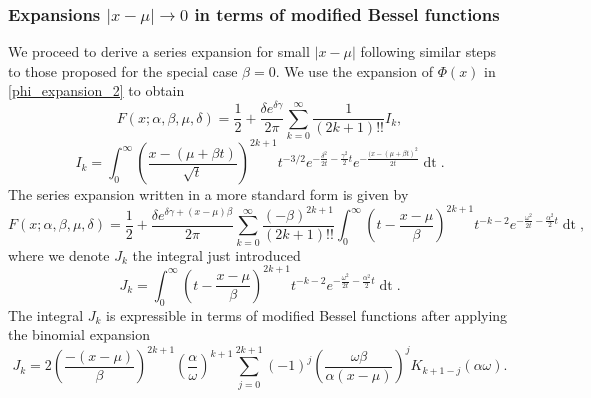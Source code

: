 \documentclass[10pt,a4paper,oneside]{article}
\numberwithin{equation}{section}
\begin{document}
\subsubsection{Expansions $|x-\mu| \to 0$ in terms of modified Bessel functions}
We proceed to derive a series expansion for small $|x-\mu|$ following similar steps to those proposed for the special case $\beta = 0$. We use the expansion of $\Phi(x)$ in  \eqref{phi_expansion_2} to obtain
\begin{equation}\label{general_series_xmu_zero_integral}
F(x;\alpha, \beta, \mu, \delta) = \frac{1}{2} + \frac{\delta e^{\delta \gamma}}{2\pi} \sum_{k=0}^{\infty} \frac{1}{(2k + 1)!!}I_k,
\end{equation}
\begin{equation}\label{general_xmu_zero_integral}
I_k = \int_0^{\infty} \left(\frac{x - (\mu +\beta t)}{\sqrt{t}}\right)^{2k+1} t^{-3/2} e^{-\frac{\delta^2}{2t} - \frac{\gamma^2}{2}t} e^{- \frac{(x-(\mu + \beta t)^2}{2t}} \mathop{dt}.
\end{equation}
The series expansion written in a more standard form is given by
\begin{equation}\label{general_series_xmu_zero_integral_2}
F(x;\alpha, \beta, \mu, \delta) = \frac{1}{2} + \frac{\delta e^{\delta \gamma + (x -\mu)\beta}}{2\pi}\sum_{k=0}^{\infty} \frac{(-\beta)^{2k+1}}{(2k + 1)!!}\int_0^{\infty} \left(t - \frac{x-\mu}{\beta}\right)^{2k+1} t^{-k-2} e^{-\frac{\omega^2}{2t} - \frac{\alpha^2}{2}t} \mathop{dt},
\end{equation}
where we denote $J_k$ the integral just introduced
\begin{equation}
J_k = \int_0^{\infty} \left(t - \frac{x-\mu}{\beta}\right)^{2k+1} t^{-k-2} e^{-\frac{\omega^2}{2t} - \frac{\alpha^2}{2}t} \mathop{dt}.
\end{equation}
The integral $J_k$ is expressible in terms of modified Bessel functions after applying the binomial expansion
\begin{equation}
J_k = 2 \left(\frac{-(x-\mu)}{\beta}\right)^{2k+1} \left(\frac{\alpha}{\omega}\right)^{k+1} \sum_{j=0}^{2k+1} (-1)^j \left(\frac{\omega \beta}{\alpha (x-\mu)}\right)^j K_{k + 1 - j}(\alpha \omega).
\end{equation}
\end{document}
